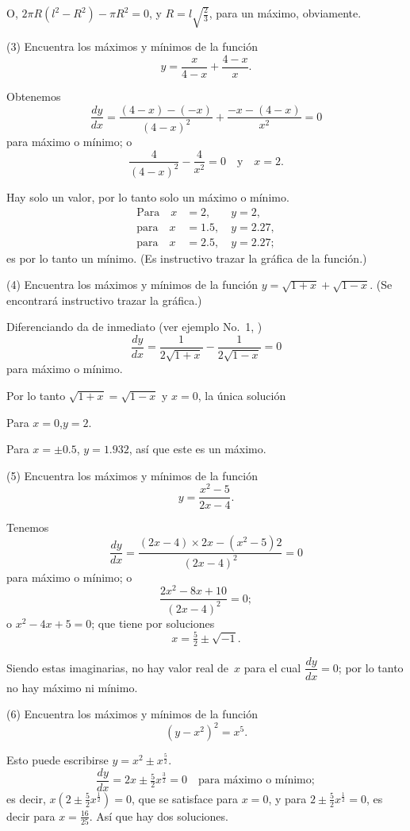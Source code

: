 \documentclass[12pt]{book}[2005/09/16]
\newcommand{\DPPageSep}[2]{\Pagelabel{#2}}
\newcommand{\Pagelabel}[1]
  {\phantomsection\label{#1}}
\newcommand{\Pageref}[2][p.]{%
  \ifthenelse{\not\equal{#1}{}}{%
    \hyperref[#2]{#1~\pageref{#2}}%
  }{%
    \hyperref[#2]{\pageref{#2}}%
  }%
}
\newcommand{\DPtypo}[2]{#2}%
\newcommand{\efrac}[2]{\frac{#1}{#2}}
\begin{document}
O, $2\pi R(l^2 - R^2) - \pi R^2 = 0$, y $R = l\sqrt{\tfrac{2}{3}}$, para un máximo,
obviamente.
\DPPageSep{118.png}{106}%

(3) Encuentra los máximos y mínimos de la función
\[
y = \dfrac{x}{4-x} + \dfrac{4-x}{x}.
\]

Obtenemos
\[
\dfrac{dy}{dx} = \dfrac{(4-x)-(-x)}{(4-x)^2} + \dfrac{-x - (4-x)}{x^2} = 0
\]
para máximo o mínimo; o
\[
\dfrac{4}{(4-x)^2} - \dfrac{4}{x^2} = 0 \quad\text{y}\quad x = 2.
\]

Hay solo un valor, por lo tanto solo un máximo
o mínimo.
\begin{align*}
\text{Para}\quad x &= 2,\phantom{.5}\quad y = 2, \\
\text{para}\quad x &= 1.5,\quad y = 2.27,   \\
\text{para}\quad x &= 2.5,\quad y = 2.27;
\end{align*}
es por lo tanto un mínimo. (Es instructivo trazar
la gráfica de la función.)

(4) Encuentra los máximos y mínimos de la función
$y = \sqrt{1+x} + \sqrt{1-x}$. (Se encontrará instructivo
trazar la gráfica.)

Diferenciando da de inmediato (ver ejemplo No.~1,
\Pageref{ExNo1})
\[
\dfrac{dy}{dx} = \dfrac{1}{2\sqrt{1+x}} - \dfrac{1}{2\sqrt{1-x}} = 0
\]
para máximo o mínimo.

Por lo tanto $\sqrt{1+x} = \sqrt{1-x}$ y $x = 0$, la única solución

Para $x=0$,\quad $y=2$.

Para $x=±0.5$, $y= 1.932$, así que este es un máximo.
\DPPageSep{119.png}{107}%

(5) Encuentra los máximos y mínimos de la función
\[
y = \dfrac{x^2-5}{2x-4}.
\]

Tenemos
\[
\dfrac{dy}{dx} = \dfrac{(2x-4) × 2x - (x^2-5)2}{(2x-4)^2} = 0
\]
para máximo o mínimo; o
\[
\dfrac{2x^2 - 8x + 10}{\DPtypo{(2x - 5)^2}{(2x - 4)^2}} = 0;
\]
o $x^2 - 4x + 5 = 0$; que tiene por soluciones
\[
x = \tfrac{5}{2} ± \sqrt{-1}.
\]

Siendo estas imaginarias, no hay valor real de~$x$
para el cual $\dfrac{dy}{dx} = 0$; por lo tanto no hay máximo ni
mínimo.

(6) Encuentra los máximos y mínimos de la función
\[
(y-x^2)^2 = x^5.
\]

Esto puede escribirse $y = x^2 ± x^{\efrac{5}{2}}$.
\[
\dfrac{dy}{dx} = 2x ± \tfrac{5}{2} x^{\efrac{3}{2}} = 0 \quad\text{para máximo o mínimo};
\]
es decir, $x(2 ± \tfrac{5}{2} x^{\efrac{1}{2}}) = 0$, que se satisface para $x = 0$,
y para $2 ± \tfrac{5}{2} x^{\efrac{1}{2}} = 0$, es decir para $x=\tfrac{16}{25}$. Así que hay
dos soluciones.
\end{document}
